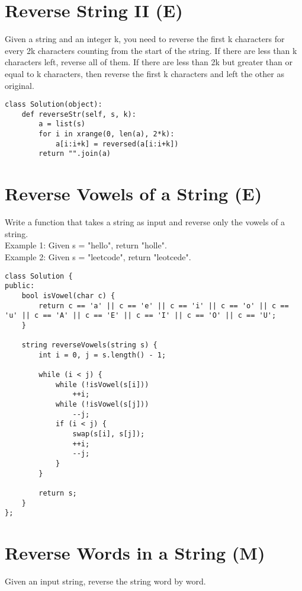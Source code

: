 \section{Reverse String II (E)}
Given a string and an integer k, you need to reverse the first k characters for every 2k characters counting from the start of the string. If there are less than k characters left, reverse all of them. If there are less than 2k but greater than or equal to k characters, then reverse the first k characters and left the other as original. 

\begin{lstlisting}
class Solution(object):
    def reverseStr(self, s, k):
        a = list(s)
        for i in xrange(0, len(a), 2*k):
            a[i:i+k] = reversed(a[i:i+k])
        return "".join(a)
\end{lstlisting}

\section{Reverse Vowels of a String (E)}
Write a function that takes a string as input and reverse only the vowels of a string. \\

Example 1:
Given s = "hello", return "holle". \\

Example 2:
Given s = "leetcode", return "leotcede". \\

\begin{lstlisting}
class Solution {
public:
    bool isVowel(char c) {
        return c == 'a' || c == 'e' || c == 'i' || c == 'o' || c == 'u' || c == 'A' || c == 'E' || c == 'I' || c == 'O' || c == 'U';
    }
    
    string reverseVowels(string s) {
        int i = 0, j = s.length() - 1;
        
        while (i < j) {
            while (!isVowel(s[i]))
                ++i;
            while (!isVowel(s[j]))
                --j;
            if (i < j) {
                swap(s[i], s[j]);
                ++i;
                --j;
            }
        }
        
        return s;
    }
};
\end{lstlisting}


\section{Reverse Words in a String (M)}
Given an input string, reverse the string word by word.\\

